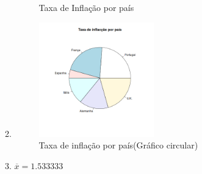 \documentclass[11pt,a4paper]{report}
\begin{document}
\begin{enumerate}[label=\arabic{chapter}.\arabic*]
\begin{enumerate}[label=\alph*)]
\begin{figure}[h!]
				\caption{Taxa de Inflação por país}
			\end{figure}
	\clearpage
		\item \hfill
			\begin{figure}[h!]
				\centering
				\includegraphics[width=0.5\textwidth]{imagem/ieedr/ex4_4b.png}
				\caption{Taxa de inflação por país(Gráfico
				circular)}
			\end{figure}
		\item $\overline{x} = 1.533333$
		\end{enumerate}
\end{enumerate}

\clearpage
\begingroup
\let\clearpage\relax
\printbibliography[heading=bibintoc,title={Bibliografia}]
\listoftables{}
\listoffigures{}
\endgroup
\end{document}

